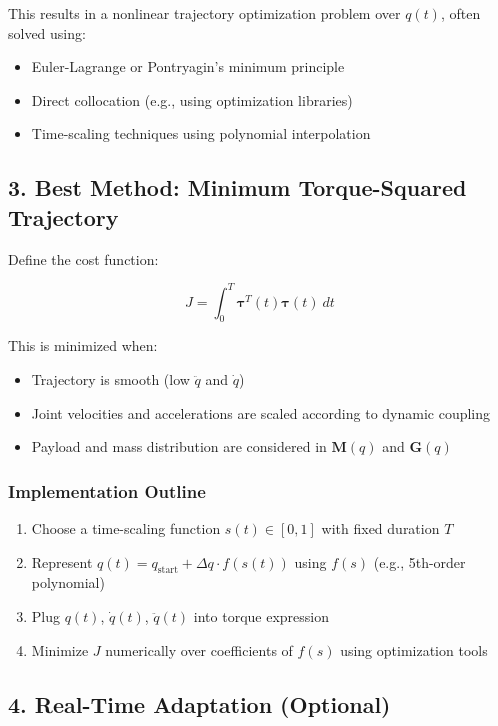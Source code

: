 \documentclass[a4paper,12pt]{article}
\begin{document}
This results in a nonlinear trajectory optimization problem over $q(t)$, often solved using:
\begin{itemize}
    \item Euler-Lagrange or Pontryagin’s minimum principle
    \item Direct collocation (e.g., using optimization libraries)
    \item Time-scaling techniques using polynomial interpolation
\end{itemize}

\subsection*{3. Best Method: Minimum Torque-Squared Trajectory}

Define the cost function:

\[
J = \int_0^T \boldsymbol{\tau}^T(t) \boldsymbol{\tau}(t) ~dt
\]

This is minimized when:
\begin{itemize}
    \item Trajectory is smooth (low $\ddot{q}$ and $\dot{q}$)
    \item Joint velocities and accelerations are scaled according to dynamic coupling
    \item Payload and mass distribution are considered in $\mathbf{M}(q)$ and $\mathbf{G}(q)$
\end{itemize}

\subsubsection*{Implementation Outline}

\begin{enumerate}
    \item Choose a time-scaling function $s(t) \in [0, 1]$ with fixed duration $T$
    \item Represent $q(t) = q_{\text{start}} + \Delta q \cdot f(s(t))$ using $f(s)$ (e.g., 5th-order polynomial)
    \item Plug $q(t)$, $\dot{q}(t)$, $\ddot{q}(t)$ into torque expression
    \item Minimize $J$ numerically over coefficients of $f(s)$ using optimization tools
\end{enumerate}

\subsection*{4. Real-Time Adaptation (Optional)}
\end{document}
